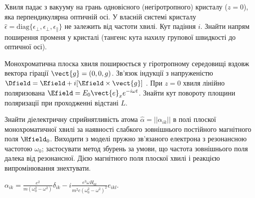 \begin{problem}
Хвиля падає з вакууму на грань одновісного (негіротропного) кристалу ($z = 0$), яка перпендикулярна оптичній осі. У власній системі кристалу $\hat{\epsilon} = \mathrm{diag}\{\epsilon_\bot, \epsilon_\bot, \epsilon_\parallel\}$  не залежить від частоти хвилі. Кут падіння $i$. Знайти напрям поширення променя у кристалі (тангенс кута нахилу групової швидкості до оптичної осі).
\end{problem}

\begin{problem}
Монохроматична плоска хвиля поширюється у гіротропному середовищі вздовж вектора гірації $\vect{g} = (0,0,g)$. Зв’язок індукції з напруженістю $\Dfield = \Efield + i[\Efield \times \vect{g} ]$ . При $z= 0$ хвиля лінійно поляризована $\Efield = E_0\vect{e}_x e^{- i\omega t}$. Знайти кут повороту площини поляризації при проходженні відстані $L$.
\end{problem}

\begin{problem}%
Знайти діелектричну сприйнятливість атома $\hat\alpha = || \alpha_{ik} ||$ в полі плоскої
монохроматичної хвилі за наявності слабкого зовнішнього постійного магнітного поля $\Hfield_0$.
Виходити з моделі пружно зв'язаного електрона з резонансною частотою $\omega_0$; застосувати метод
збурень за умови, що частота зовнішнього поля далека від резонансної. Дією магнітного поля плоскої
хвилі і реакцією випромінювання знехтувати.
\begin{solution}
	$\alpha_{ik} = \frac{e^2}{m(\omega_0^2 - \omega^2)}\delta_{ik} - i \frac{e^3\omega
	H_{0l}}{m^2c(\omega_0^2 - \omega^2)^2}e_{ikl}$.
\end{solution}
\end{problem}

